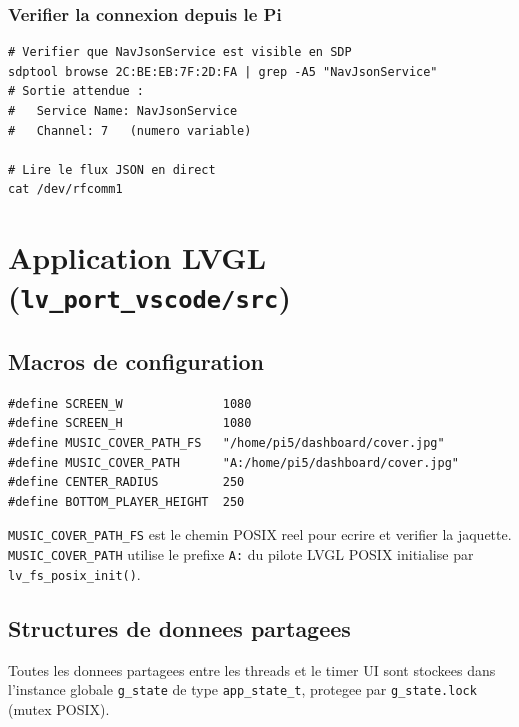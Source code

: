 \documentclass[a4paper,11pt]{article}
\begin{document}
\subsubsection{Verifier la connexion depuis le Pi}

\begin{lstlisting}[style=bashcode]
# Verifier que NavJsonService est visible en SDP
sdptool browse 2C:BE:EB:7F:2D:FA | grep -A5 "NavJsonService"
# Sortie attendue :
#   Service Name: NavJsonService
#   Channel: 7   (numero variable)

# Lire le flux JSON en direct
cat /dev/rfcomm1
\end{lstlisting}

\section{Application LVGL (\texttt{lv\_port\_vscode/src})}

\subsection{Macros de configuration}

\begin{lstlisting}[style=ccode,caption={main.c --- macros de configuration}]
#define SCREEN_W              1080
#define SCREEN_H              1080
#define MUSIC_COVER_PATH_FS   "/home/pi5/dashboard/cover.jpg"
#define MUSIC_COVER_PATH      "A:/home/pi5/dashboard/cover.jpg"
#define CENTER_RADIUS         250
#define BOTTOM_PLAYER_HEIGHT  250
\end{lstlisting}

\texttt{MUSIC\_COVER\_PATH\_FS} est le chemin POSIX reel pour ecrire et verifier la
jaquette. \texttt{MUSIC\_COVER\_PATH} utilise le prefixe \texttt{A:} du pilote LVGL POSIX
initialise par \texttt{lv\_fs\_posix\_init()}.

\subsection{Structures de donnees partagees}

Toutes les donnees partagees entre les threads et le timer UI sont stockees dans
l'instance globale \texttt{g\_state} de type \texttt{app\_state\_t}, protegee par
\texttt{g\_state.lock} (mutex POSIX).
\end{document}
